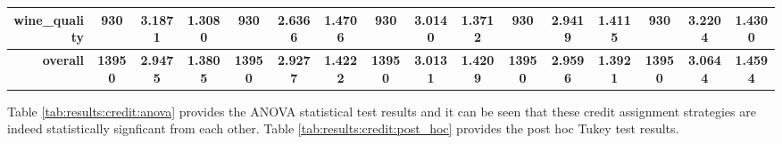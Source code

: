 \begin{table}[htbp]
{\begin{tabular}{rccccccccccccccc}
			wine\_quality                       & 930                                 & 3.1871                                                                    & 1.3080          & 930                                & \cellcolor[rgb]{ .776,  .937,  .808}\textcolor[rgb]{ 0,  .38,  0}{2.6366}          & 1.4706          & 930                                & 3.0140                                                                    & 1.3712          & 930                                & 2.9419                                                                    & 1.4115          & 930                                    & 3.2204                                                                    & 1.4300          \\
			\midrule
			\textbf{overall}                    & \textbf{13950}                      & \textbf{2.9475}                                                           & \textbf{1.3805} & \textbf{13950}                     & \cellcolor[rgb]{ .776,  .937,  .808}\textcolor[rgb]{ 0,  .38,  0}{\textbf{2.9277}} & \textbf{1.4222} & \textbf{13950}                     & \textbf{3.0131}                                                           & \textbf{1.4209} & \textbf{13950}                     & \textbf{2.9596}                                                           & \textbf{1.3921} & \textbf{13950}                         & \textbf{3.0644}                                                           & \textbf{1.4594} \\
		\end{tabular}%
	}
\end{table}%

Table \ref{tab:results:credit:anova} provides the ANOVA statistical test results and it can be seen that these credit assignment strategies are indeed statistically signficant from each other. Table \ref{tab:results:credit:post_hoc} provides the post hoc Tukey test results.

\begin{table}[htbp]
	\centering
	\caption{ANOVA - Rank - BHH Variant: Credit}
	\label{tab:results:credit:anova}%
	\par\bigskip
\end{table}


